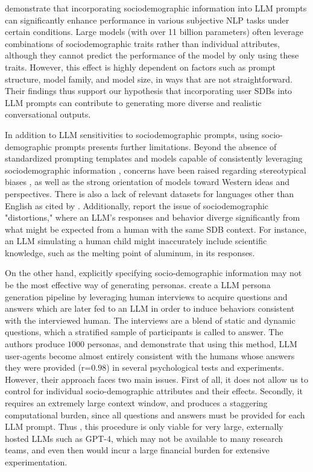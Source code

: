\citet{beck-etal-2024-sensitivity} demonstrate that incorporating sociodemographic information into LLM prompts can significantly enhance performance in various subjective \ac{NLP} tasks under certain conditions. Large models (with over 11 billion parameters) often leverage combinations of sociodemographic traits rather than individual attributes, although they cannot predict the performance of the model by only using these traits. However, this effect is highly dependent on factors such as prompt structure, model family, and model size, in ways that are not straightforward. Their findings thus support our hypothesis that incorporating user \acp{SDB} into LLM prompts can contribute to generating more diverse and realistic conversational outputs.

In addition to LLM sensitivities to sociodemographic prompts, using socio-demographic prompts presents further limitations. Beyond the absence of standardized prompting templates and models capable of consistently leveraging sociodemographic information \cite{beck-etal-2024-sensitivity}, concerns have been raised regarding stereotypical biases \cite{cheng-etal-2023-marked, deshpande-etal-2023-toxicity}, as well as the strong orientation of models toward Western ideas and perspectives. There is also a lack of relevant datasets for languages other than English \cite{pmlr-v202-santurkar23a, durmus2024measuringrepresentationsubjectiveglobal, santy-etal-2023-nlpositionality} as cited by \citet{beck-etal-2024-sensitivity}. Additionally, \citet{aher2023usinglargelanguagemodels} report the issue of sociodemographic "distortions," where an LLM’s responses and behavior diverge significantly from what might be expected from a human with the same \ac{SDB} context. For instance, an LLM simulating a human child might inaccurately include scientific knowledge, such as the melting point of aluminum, in its responses.

On the other hand, explicitly specifying socio-demographic information may not be the most effective way of generating personas. \citet{park2024generativeagentsimulations1000} create a LLM persona generation pipeline by leveraging human interviews to acquire questions and answers which are later fed to an LLM in order to induce behaviors consistent with the interviewed human. The interviews are a blend of static and dynamic questions, which a stratified sample of participants is called to answer. The authors produce $1000$ personas, and demonstrate that using this method, LLM user-agents become almost entirely consistent with the humans whose answers they were provided (r=$0.98$) in several psychological tests and experiments.  However, their approach faces two main issues. First of all, it does not allow us to control for individual socio-demographic attributes and their effects. Secondly, it requires an extremely large context window, and produces a staggering computational burden, since all questions and answers must be provided for each LLM prompt. Thus , this procedure is only viable for very large, externally hosted LLMs such as GPT-4, which may not be available to many research teams, and even then would incur a large financial burden for extensive experimentation.


